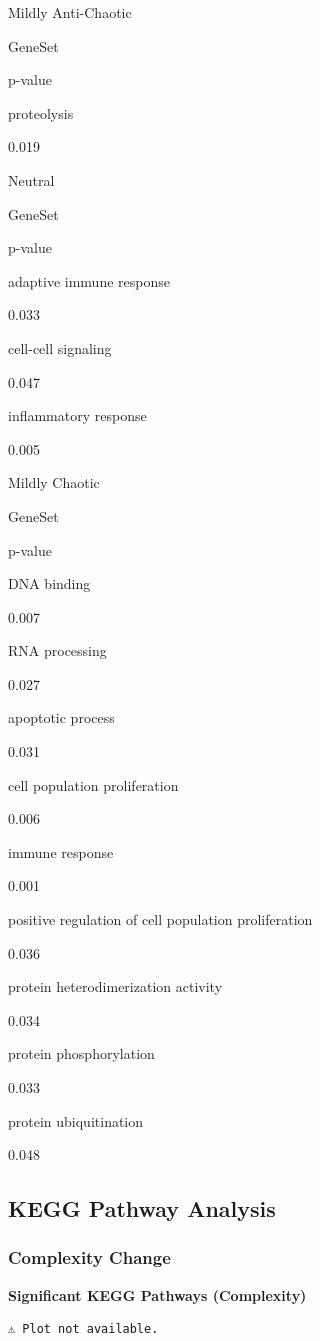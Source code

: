 \documentclass[
  letterpaper,
  DIV=11,
  numbers=noendperiod,
  openany,
  oneside]{scrreprt}
\begin{document}
Mildly Anti-Chaotic

GeneSet

p-value

proteolysis

0.019

Neutral

GeneSet

p-value

adaptive immune response

0.033

cell-cell signaling

0.047

inflammatory response

0.005

Mildly Chaotic

GeneSet

p-value

DNA binding

0.007

RNA processing

0.027

apoptotic process

0.031

cell population proliferation

0.006

immune response

0.001

positive regulation of cell population proliferation

0.036

protein heterodimerization activity

0.034

protein phosphorylation

0.033

protein ubiquitination

0.048

\subsection{KEGG Pathway Analysis}

\subsubsection{Complexity Change}

\textbf{Significant KEGG Pathways (Complexity)}

\begin{verbatim}
⚠️ Plot not available.
\end{verbatim}
\end{document}
